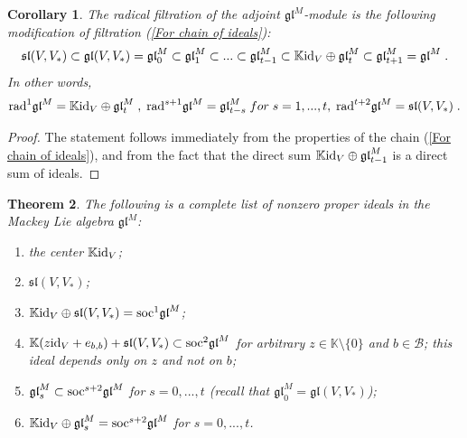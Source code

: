\documentclass[12pt]{article}
\def\KK {{\mathbb K}}     %
\def\B  {\mathcal B}
\def\mk {\mathfrak}
\newtheorem{theorem}{Theorem}[section]
\newtheorem{coro}[theorem]{Corollary}
\begin{document}
\begin{coro}
The radical filtration of the adjoint $\mk{gl}^M$-module is the following modification of filtration (\ref{For chain of ideals}):
\begin{gather*}
\mk{sl}(V,V_*)\subset\mk{gl}(V,V_*)=\mk{gl}^M_0\subset\mk{gl}^M_1\subset ...\subset\mk{gl}^M_{t-1}\subset \KK{\rm id}_V\oplus\mk{gl}^M_{t} \subset \mk{gl}^M_{t+1}=\mk{gl}^M\;.
\end{gather*}
In other words,
\begin{gather*}
{\rm rad}^1\mk{gl}^M  = \KK{\rm id}_V\oplus\mk{gl}^M_{t} \;,\;  {\rm rad}^{s+1}\mk{gl}^M = \mk{gl}^M_{t-s} \; for\; s=1,...,t,\;
{\rm rad}^{t+2}\mk{gl}^M = \mk{sl}(V,V_*)\;.
\end{gather*}
\end{coro}

\begin{proof}
The statement follows immediately from the properties of the chain (\ref{For chain of ideals}), and from the fact that the direct sum $\KK{\rm id}_V\oplus\mk{gl}^M_{t-1}$ is a direct sum of ideals.
\end{proof}


\begin{theorem}\label{Theo Ideals List}
The following is a complete list of nonzero proper ideals in the Mackey Lie algebra $\mk{gl}^M$:
\begin{enumerate}
\item[{\rm (i)}] the center $\KK{\rm id}_V$; 
\item[{\rm (ii)}] $\mk{sl}(V,V_*)$;
\item[{\rm (iii)}] $\KK{\rm id}_V\oplus \mk{sl}(V,V_*)={\rm soc}^1\mk{gl}^M$; 
\item[{\rm (iv)}] $\KK(z{\rm id}_V+ e_{b,b})+\mk{sl}(V,V_*)\subset {\rm soc}^2\mk{gl}^M$ for arbitrary $z\in\KK\setminus \{0\}$ and $b\in\B$; this ideal depends only on $z$ and not on $b$;
\item[{\rm (v)}] $\mk{gl}^M_s\subset{\rm soc}^{s+2}\mk{gl}^M$ for $s=0,...,t$ (recall that $\mk{gl}^M_0=\mk{gl}(V,V_*)$);
\item[{\rm (vi)}] $\KK{\rm id}_V\oplus\mk{gl}^M_s ={\rm soc}^{s+2}\mk{gl}^M$ for $s=0,...,t$.
\end{enumerate}
\end{theorem}
\end{document}
